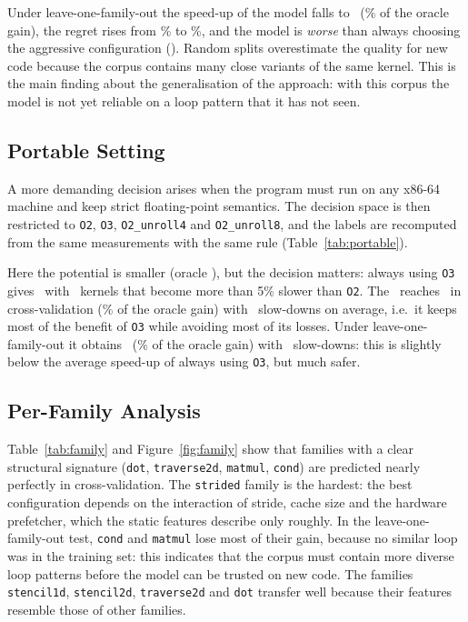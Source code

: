 \documentclass[12pt,a4paper]{article}
\begin{document}


Under leave-one-family-out the speed-up of the model falls to \selGMLOFO\ (\selFracLOFO\% of the oracle gain), the regret
rises from \selRegretCV\% to \selRegretLOFO\%, and the model is \emph{worse} than always choosing the aggressive
configuration (\gmOFast). Random splits overestimate the quality for new code because the corpus contains many close variants
of the same kernel. This is the main finding about the generalisation of the approach: with this corpus the model is not yet
reliable on a loop pattern that it has not seen.

\subsection{Portable Setting}

A more demanding decision arises when the program must run on any x86-64 machine and keep strict floating-point semantics.
The decision space is then restricted to \texttt{O2}, \texttt{O3}, \texttt{O2\_unroll4} and \texttt{O2\_unroll8}, and the
labels are recomputed from the same measurements with the same rule (Table~\ref{tab:portable}).



Here the potential is smaller (oracle \pOracle), but the decision matters: always using \texttt{O3} gives \pOThree\ with
\pOThreeSlow\ kernels that become more than 5\% slower than \texttt{O2}. The \selModel\ reaches \pCV\ in cross-validation
(\pFracCV\% of the oracle gain) with \pSlowCV\ slow-downs on average, i.e.\ it keeps most of the benefit of \texttt{O3} while avoiding most of its
losses. Under leave-one-family-out it obtains \pLOFO\ (\pFracLOFO\% of the oracle gain) with \pSlowLOFO\ slow-downs: this is
slightly below the average speed-up of always using \texttt{O3}, but much safer.

\subsection{Per-Family Analysis}





Table~\ref{tab:family} and Figure~\ref{fig:family} show that families with a clear structural signature
(\texttt{dot}, \texttt{traverse2d}, \texttt{matmul}, \texttt{cond}) are predicted nearly perfectly in
cross-validation. The \texttt{strided} family is the hardest: the best configuration depends on the
interaction of stride, cache size and the hardware prefetcher, which the static features describe only
roughly. In the leave-one-family-out test, \texttt{cond} and \texttt{matmul} lose most of their gain,
because no similar loop was in the training set: this indicates that the corpus must contain more
diverse loop patterns before the model can be trusted on new code. The families
\texttt{stencil1d}, \texttt{stencil2d}, \texttt{traverse2d} and \texttt{dot} transfer well because their
features resemble those of other families.
\end{document}

